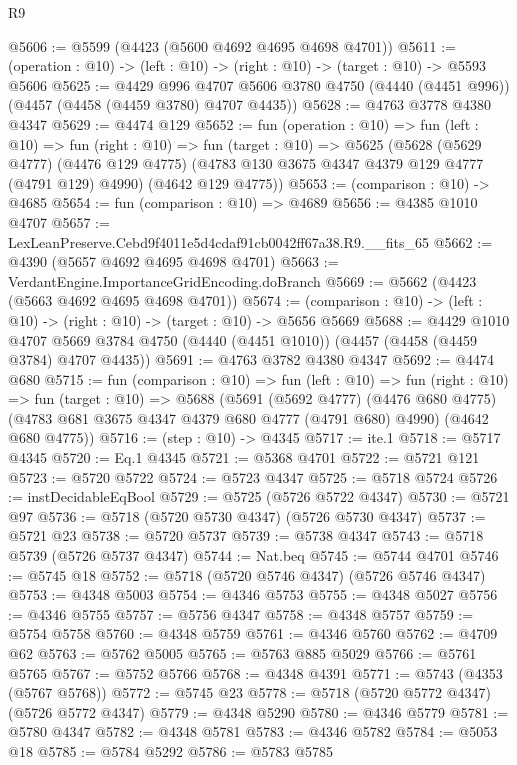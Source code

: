 \begin{lexlean}{R9}
\begin{coremodule}
@5606 := @5599 (@4423 (@5600 @4692 @4695 @4698 @4701))
@5611 := (operation : @10) -> (left : @10) -> (right : @10) -> (target : @10) -> @5593 @5606
@5625 := @4429
    @996
    @4707
    @5606
    @3780
    @4750
    (@4440 (@4451 @996))
    (@4457 (@4458 (@4459 @3780) @4707 @4435))
@5628 := @4763 @3778 @4380 @4347
@5629 := @4474 @129
@5652 := fun (operation : @10) =>
  fun (left : @10) =>
  fun (right : @10) =>
  fun (target : @10) =>
  @5625
    (@5628
      (@5629 @4777)
      (@4476 @129 @4775)
      (@4783 @130 @3675 @4347 @4379 @129 @4777 (@4791 @129) @4990)
      (@4642 @129 @4775))
@5653 := (comparison : @10) -> @4685
@5654 := fun (comparison : @10) => @4689
@5656 := @4385 @1010 @4707
@5657 := LexLeanPreserve.Cebd9f4011e5d4cdaf91cb0042ff67a38.R9.__fits_65
@5662 := @4390 (@5657 @4692 @4695 @4698 @4701)
@5663 := VerdantEngine.ImportanceGridEncoding.doBranch
@5669 := @5662 (@4423 (@5663 @4692 @4695 @4698 @4701))
@5674 := (comparison : @10) -> (left : @10) -> (right : @10) -> (target : @10) -> @5656 @5669
@5688 := @4429
    @1010
    @4707
    @5669
    @3784
    @4750
    (@4440 (@4451 @1010))
    (@4457 (@4458 (@4459 @3784) @4707 @4435))
@5691 := @4763 @3782 @4380 @4347
@5692 := @4474 @680
@5715 := fun (comparison : @10) =>
  fun (left : @10) =>
  fun (right : @10) =>
  fun (target : @10) =>
  @5688
    (@5691
      (@5692 @4777)
      (@4476 @680 @4775)
      (@4783 @681 @3675 @4347 @4379 @680 @4777 (@4791 @680) @4990)
      (@4642 @680 @4775))
@5716 := (step : @10) -> @4345
@5717 := ite.{1}
@5718 := @5717 @4345
@5720 := Eq.{1} @4345
@5721 := @5368 @4701
@5722 := @5721 @121
@5723 := @5720 @5722
@5724 := @5723 @4347
@5725 := @5718 @5724
@5726 := instDecidableEqBool
@5729 := @5725 (@5726 @5722 @4347)
@5730 := @5721 @97
@5736 := @5718 (@5720 @5730 @4347) (@5726 @5730 @4347)
@5737 := @5721 @23
@5738 := @5720 @5737
@5739 := @5738 @4347
@5743 := @5718 @5739 (@5726 @5737 @4347)
@5744 := Nat.beq
@5745 := @5744 @4701
@5746 := @5745 @18
@5752 := @5718 (@5720 @5746 @4347) (@5726 @5746 @4347)
@5753 := @4348 @5003
@5754 := @4346 @5753
@5755 := @4348 @5027
@5756 := @4346 @5755
@5757 := @5756 @4347
@5758 := @4348 @5757
@5759 := @5754 @5758
@5760 := @4348 @5759
@5761 := @4346 @5760
@5762 := @4709 @62
@5763 := @5762 @5005
@5765 := @5763 @885 @5029
@5766 := @5761 @5765
@5767 := @5752 @5766
@5768 := @4348 @4391
@5771 := @5743 (@4353 (@5767 @5768))
@5772 := @5745 @23
@5778 := @5718 (@5720 @5772 @4347) (@5726 @5772 @4347)
@5779 := @4348 @5290
@5780 := @4346 @5779
@5781 := @5780 @4347
@5782 := @4348 @5781
@5783 := @4346 @5782
@5784 := @5053 @18
@5785 := @5784 @5292
@5786 := @5783 @5785

\end{coremodule}
\end{lexlean}
